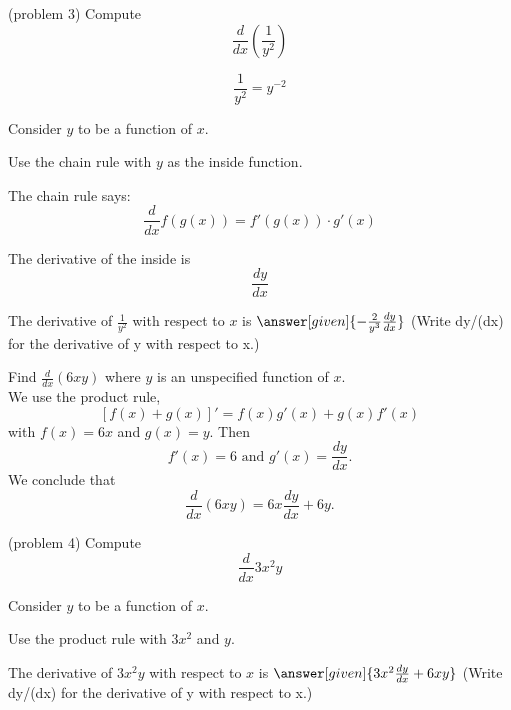 \documentclass{ximera}
\begin{document}
\begin{problem}(problem 3)
  Compute
  \[
  \frac{d}{dx} \left( \frac{1}{y^2} \right)
  \]
  
	  \begin{hint}
      \[\frac{1}{y^2} = y^{-2}\]
    \end{hint}
    \begin{hint}
      Consider $y$ to be a function of $x$.
    \end{hint}
    \begin{hint}
      Use the chain rule with $y$ as the inside function.
    \end{hint}
    \begin{hint}
      The chain rule says:
      \[
      \frac{d}{dx} f(g(x)) = f'(g(x))\cdot g'(x)
      \]
    \end{hint}
    \begin{hint}
      The derivative of the inside is 
      \[
      \frac{dy}{dx}
      \]
    \end{hint}
    
		The derivative of $\frac{1}{y^2}$ with respect to $x$ is
		 $\answer[given]{-\frac{2}{y^3} \frac{dy}{dx}}$  (Write dy/(dx) for the derivative of y with respect to x.)
		
\end{problem}


\begin{example}[example 4]
Find $\frac{d}{dx} (6xy)$ where $y$ is an unspecified function of $x$.\\
We use the product rule,
\[\displaystyle{[f(x) + g(x)]' = f(x)g'(x) + g(x)f'(x)}\]
with $f(x) = 6x$ and $g(x) = y$. Then 
\[f'(x) = 6 \text{ and } g'(x) = \frac{dy}{dx}.\]
We conclude that
\[\frac{d}{dx} (6xy) = 6x \frac{dy}{dx} + 6y.\]
\end{example}



\begin{center}
\begin{foldable}
\end{foldable}
\end{center}


\begin{problem}(problem 4)
  Compute
  \[
  \frac{d}{dx} 3x^2y
  \]
  
	  
    \begin{hint}
      Consider $y$ to be a function of $x$.
    \end{hint}
		\begin{hint}
      Use the product rule with $3x^2$ and $y$.
    \end{hint}
    
    
		The derivative of $3x^2y$ with respect to $x$ is
		 $\answer[given]{3x^2  \frac{dy}{dx} + 6xy}$  (Write dy/(dx) for the derivative of y with respect to x.)
		
\end{problem}
\end{document}
